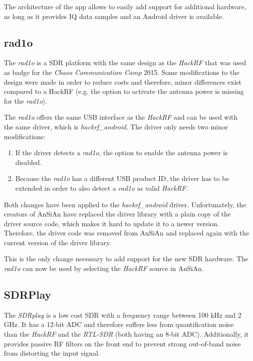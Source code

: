 The architecture of the app allows to easily add support for additional hardware,
as long as it provides IQ data samples and an Android driver is available.

\subsection{rad1o}

The \emph{rad1o} is a \ac{SDR} platform with the same design as the
\emph{HackRF} that was used as badge for the \emph{Chaos Communication Camp}
2015. Some modifications to the design were made in order to reduce costs and
therefore, minor differences exist compared to a HackRF (e.g. the option to
activate the antenna power is missing for the \emph{rad1o}).

The \emph{rad1o} offers the same USB interface as the \emph{HackRF} and can be
used with the same driver, which is \emph{hackrf\_android}. The driver only needs
two minor modifications:
\begin{enumerate}
	\item If the driver detects a \emph{rad1o}, the option to enable the antenna power
		is disabled.
	\item Because the \emph{rad1o} has a different USB product ID, the driver has
		to be extended in order to also detect a \emph{rad1o} as valid \emph{HackRF}.
\end{enumerate}

Both changes have been applied to the \emph{hackrf\_android} driver. Unfortunately, the
creators of \ac{AnSiAn} have replaced the driver library with a plain copy of the driver
source code, which makes it hard to update it to a newer version. Therefore, the
driver code was removed from \ac{AnSiAn} and replaced again with the current version
of the driver library.

This is the only change necessary to add support for the new \ac{SDR} hardware. 
The \emph{rad1o} can now be used by selecting the \emph{HackRF} source in \ac{AnSiAn}.


\subsection{SDRPlay}

The \emph{SDRplay} is a low cost \ac{SDR} with a frequency range between 100 kHz and
2 GHz. It has a 12-bit \ac{ADC} and therefore suffers less from quantification noise
than the \emph{HackRF} and the \emph{RTL-SDR} (both having an 8-bit \ac{ADC}).
Additionally, it provides passive \ac{RF} filters on the front end to prevent strong
out-of-band noise from distorting the input signal.

